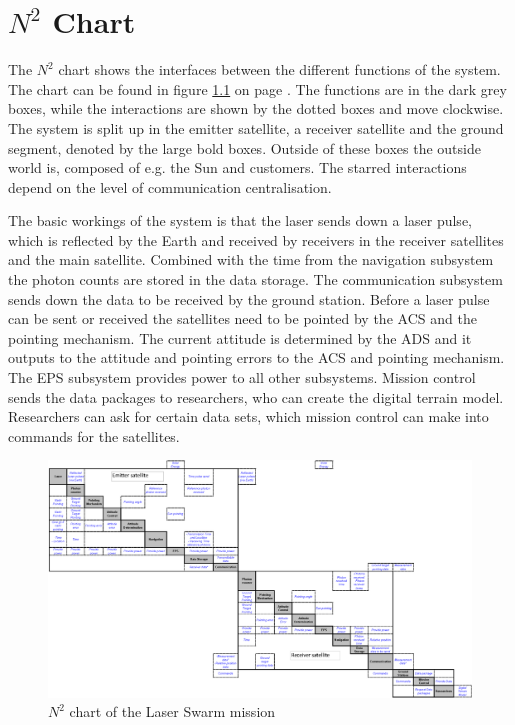 \chapter{$N^2$ Chart}
\label{sec:n2chart}
The $N^2$ chart shows the interfaces between the different functions of the system. The chart can be found in figure \ref{fig:n2chart} on page \pageref{fig:n2chart}. The functions are in the dark grey boxes, while the interactions are shown by the dotted boxes and move clockwise. The system is split up in the emitter satellite, a receiver satellite and the ground segment, denoted by the large bold boxes. Outside of these boxes the outside world is, composed of e.g. the Sun and customers. The starred interactions depend on the level of communication centralisation.

The basic workings of the system is that the laser sends down a laser pulse, which is reflected by the Earth and received by receivers in the receiver satellites and the main satellite. Combined with the time from the navigation subsystem the photon counts are stored in the data storage. The communication subsystem sends down the data to be received by the ground station. Before a laser pulse can be sent or received the satellites need to be pointed by the \acl{ACS} and the pointing mechanism. The current attitude is determined by the \ac{ADS} and it outputs to the attitude and pointing errors to the \ac{ACS} and pointing mechanism. The \ac{EPS} subsystem provides power to all other subsystems. Mission control sends the data packages to researchers, who can create the digital terrain model. Researchers can ask for certain data sets, which mission control can make into commands for the satellites.

\begin{figure}
\centering
\includegraphics[angle=90, height=\textheight]{chapters/img/N2chart_wo.png} 
\caption{$N^2$ chart of the Laser Swarm mission}
\label{fig:n2chart}
\end{figure}